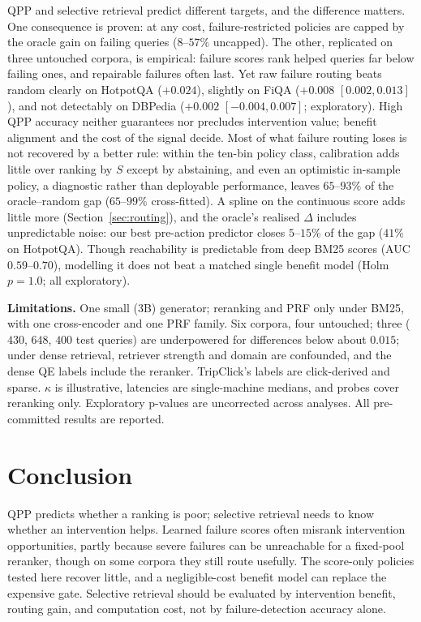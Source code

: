 \documentclass[sigconf,anonymous,review]{acmart}
\begin{document}
QPP and selective retrieval predict different targets, and the
difference matters. One consequence is proven: at any cost,
failure-restricted policies are capped by the oracle gain on failing
queries ($8$--$57\%$ uncapped). The other, replicated on three
untouched corpora, is empirical: failure scores rank helped queries far
below failing ones, and repairable failures often last. Yet raw failure routing beats random clearly on HotpotQA
($+0.024$), slightly on FiQA ($+0.008$ $[0.002,0.013]$), and not
detectably on DBPedia ($+0.002$ $[-0.004,0.007]$; exploratory). High QPP accuracy
neither guarantees nor precludes intervention value; benefit alignment
and the cost of the signal decide. Most of what failure routing
loses is not recovered by a better rule: within the ten-bin policy
class, calibration adds little over ranking by $S$ except by abstaining,
and even an optimistic in-sample policy, a
diagnostic rather than deployable performance, leaves
$65$--$93\%$ of the oracle--random gap ($65$--$99\%$ cross-fitted).
A spline on the continuous score adds little more (Section~\ref{sec:routing}),
and the oracle's realised $\Delta$ includes unpredictable noise: our
best pre-action predictor closes $5$--$15\%$ of the gap ($41\%$ on
HotpotQA). Though reachability is predictable from deep BM25 scores
(AUC $0.59$--$0.70$), modelling it does not beat a matched single
benefit model (Holm $p=1.0$; all exploratory).

\textbf{Limitations.} One small (3B) generator; reranking and PRF only
under BM25, with one cross-encoder and one PRF family. Six corpora,
four untouched; three ($430$, $648$, $400$ test queries) are
underpowered for differences below about $0.015$;
under dense retrieval, retriever strength and domain are confounded,
and the dense QE labels include the reranker. TripClick's labels are
click-derived and sparse. $\kappa$ is illustrative, latencies are single-machine medians, and
probes cover reranking only. Exploratory p-values are uncorrected
across analyses. All pre-committed results are reported.

\section{Conclusion}

QPP predicts whether a ranking is poor; selective retrieval needs to
know whether an intervention helps. Learned failure scores often
misrank intervention opportunities, partly because severe failures can
be unreachable for a fixed-pool reranker, though on some corpora they
still route usefully. The score-only policies tested here recover
little, and a
negligible-cost benefit model can replace the expensive gate.
Selective retrieval should be evaluated by
intervention benefit, routing gain, and computation cost, not by
failure-detection accuracy alone.
\end{document}
